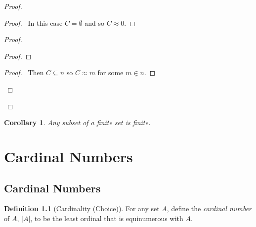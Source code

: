 \documentclass{report}
\let\qed\relax
\newtheorem{corollary}{Corollary}[axiom]
\theoremstyle{definition}
\newtheorem{definition}[axiom]{Definition}
\begin{document}
    \begin{proof}
        \pf
        \begin{proof}
            \pf\ In this case $C = \emptyset$ and so $C \approx 0$.
        \end{proof}
        \begin{proof}
            \begin{proof}
            \end{proof}
            \begin{proof}
                \pf\ Then $C \subseteq n$ so $C \approx m$ for some $m \underline{\in} n$.
            \end{proof}
        \end{proof}
        \qed
    \end{proof}

    \begin{corollary}
        Any subset of a finite set is finite.
    \end{corollary}

    \chapter{Cardinal Numbers}

    \section{Cardinal Numbers}

    \begin{definition}[Cardinality (Choice)]
        For any set $A$, define the \emph{cardinal number} of $A$, $|A|$, to be the least ordinal that is
        equinumerous with $A$.
    \end{definition}
\end{document}
